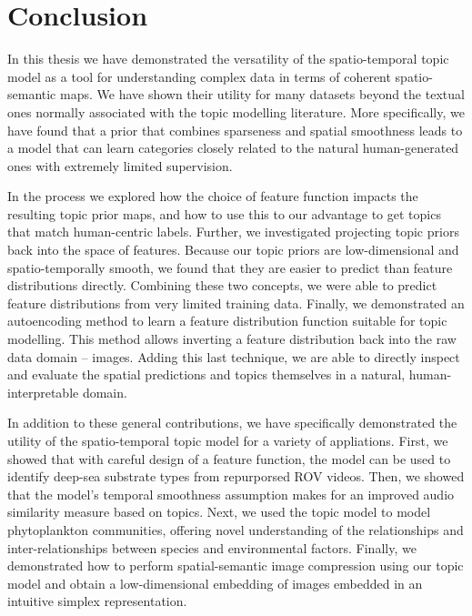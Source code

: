
\chapter{Conclusion}

In this thesis we have demonstrated the versatility of the spatio-temporal topic model as a tool for understanding complex data in terms of coherent spatio-semantic maps. We have shown their utility for many datasets beyond the textual ones normally associated with the topic modelling literature. More specifically, we have found that a prior that combines sparseness and spatial smoothness leads to a model that can learn categories closely related to the natural human-generated ones with extremely limited supervision.

In the process we explored how the choice of feature function impacts the resulting topic prior maps, and how to use this to our advantage to get topics that match human-centric labels. Further, we investigated projecting topic priors back into the space of features. Because our topic priors are low-dimensional and spatio-temporally smooth, we found that they are easier to predict than feature distributions directly. Combining these two concepts, we were able to predict feature distributions from very limited training data. Finally, we demonstrated an autoencoding method to learn a feature distribution function suitable for topic modelling. This method allows inverting a feature distribution back into the raw data domain -- images. Adding this last technique, we are able to directly inspect and evaluate the spatial predictions and topics themselves in a natural, human-interpretable domain.

In addition to these general contributions, we have specifically demonstrated the utility of the spatio-temporal topic model for a variety of appliations. First, we showed that with careful design of a feature function, the model can be used to identify deep-sea substrate types from repurporsed ROV videos. Then, we showed that the model's temporal smoothness assumption makes for an improved audio similarity measure based on topics. Next, we used the topic model to model phytoplankton communities, offering novel understanding of the relationships and inter-relationships between species and environmental factors. Finally, we demonstrated how to perform spatial-semantic image compression using our topic model and obtain a low-dimensional embedding of images embedded in an intuitive simplex representation.

